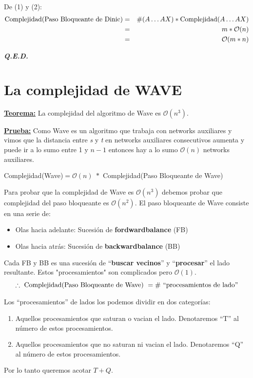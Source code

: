 \documentclass[12pt,a4paper]{report}
\newcommand{\QED}{\hfill \textit{\textbf{Q.E.D.}}}
\begin{document}
			\par De (1) y (2):
			\begin{eqnarray}
				\nonumber \textup{Complejidad(Paso Bloqueante de Dinic)} &=& \# (A \dotsc A X) * \textup{Complejidad} (A \dotsc A X) \\
				\nonumber &=& m * \mathcal{O}(n) \\
				\nonumber &=& \mathcal{O}(m*n)
			\end{eqnarray}

		\QED


	\section{La complejidad de WAVE}
		\textbf{\underline{Teorema:}} La complejidad del algoritmo de Wave es $\mathcal{O}(n^{3})$.

		\textbf{\underline{Prueba:}} Como Wave es un algoritmo que trabaja con networks auxiliares y vimos que la distancia entre \textit{s} y \textit{t} en networks auxiliares consecutivos aumenta y puede ir a lo sumo entre 1 y $n - 1$ entonces hay a lo sumo $\mathcal{O}(n)$ networks auxiliares.
			\begin{center}
				Complejidad(Wave)$ = \mathcal{O}(n) \; *$ Complejidad(Paso Bloqueante de Wave)
			\end{center}

			\par Para probar que la complejidad de Wave es $\mathcal{O}(n^{3})$ debemos probar que complejidad del paso bloqueante es $\mathcal{O}(n^{2})$. El paso bloqueante de Wave consiste en una serie de:
			\begin{itemize}
				\item Olas hacia adelante: Sucesión de \textbf{fordwardbalance} (FB)
				\item Olas hacia atrás: Sucesión de \textbf{backwardbalance} (BB)
			\end{itemize}

			\par Cada FB y BB es una sucesión de \textquotedblleft \textbf{buscar vecinos}\textquotedblright \; y \textquotedblleft \textbf{procesar}\textquotedblright \; el lado resultante. Estos "procesamientos" \; son complicados pero $ \mathcal{O}(1)$.
			\[ \therefore \textup{ Complejidad(Paso Bloqueante de Wave) } = \# \textup{ \textquotedblleft procesamientos de lado\textquotedblright} \]

			\par Los \textquotedblleft procesamientos\textquotedblright \; de lados los podemos dividir en dos categorías:
			\begin{enumerate}
				\item Aquellos procesamientos que saturan o vacian el lado. Denotaremos \textquotedblleft T\textquotedblright \; al número de estos procesamientos.
				\item Aquellos procesamientos que no saturan ni vacian el lado. Denotaremos \textquotedblleft Q\textquotedblright \; al número de estos procesamientos.
			\end{enumerate}
			\par Por lo tanto queremos acotar $T + Q$.
\end{document}
